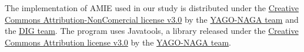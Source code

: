 The implementation of AMIE used in our study is distributed under the \hyperlink{https://creativecommons.org/licenses/by-nc/3.0/}{Creative Commons Attribution-NonComercial license v3.0} by the \hyperlink{https://www.mpi-inf.mpg.de/departments/databases-and-information-systems/research/yago-naga/amie/}{YAGO-NAGA team} and the \hyperlink{https://dig.telecom-paris.fr/blog/}{DIG team}. The program uses Javatools, a library released under the \hyperlink{https://creativecommons.org/licenses/by/3.0/}{Creative Commons Attribution license v3.0} by the \hyperlink{https://www.mpi-inf.mpg.de/departments/databases-and-information-systems/research/yago-naga/amie/}{YAGO-NAGA team}.
